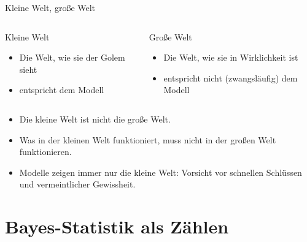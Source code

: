 \documentclass[
  ngerman,
  ignorenonframetext,
]{beamer}
\providecommand{\tightlist}{%
  \setlength{\itemsep}{0pt}\setlength{\parskip}{0pt}}
\begin{document}
\begin{frame}{Kleine Welt, große Welt}
\protect\hypertarget{kleine-welt-grouxdfe-welt-1}{}
\begin{columns}[T]
\begin{column}{0.5\textwidth}
\begin{block}{Kleine Welt}
\protect\hypertarget{kleine-welt}{}
\begin{itemize}
\tightlist
\item
  Die Welt, wie sie der Golem sieht
\item
  entspricht dem Modell
\end{itemize}
\end{block}
\end{column}

\begin{column}{0.5\textwidth}
\begin{block}{Große Welt}
\protect\hypertarget{grouxdfe-welt}{}
\begin{itemize}
\tightlist
\item
  Die Welt, wie sie in Wirklichkeit ist
\item
  entspricht nicht (zwangsläufig) dem Modell
\end{itemize}
\end{block}
\end{column}
\end{columns}

\begin{itemize}
\tightlist
\item
  Die kleine Welt ist nicht die große Welt.
\item
  Was in der kleinen Welt funktioniert, muss nicht in der großen Welt
  funktionieren.
\item
  Modelle zeigen immer nur die kleine Welt: Vorsicht vor schnellen
  Schlüssen und vermeintlicher Gewissheit.
\end{itemize}
\end{frame}

\hypertarget{bayes-statistik-als-zuxe4hlen}{%
\section{Bayes-Statistik als
Zählen}\label{bayes-statistik-als-zuxe4hlen}}
\end{document}
